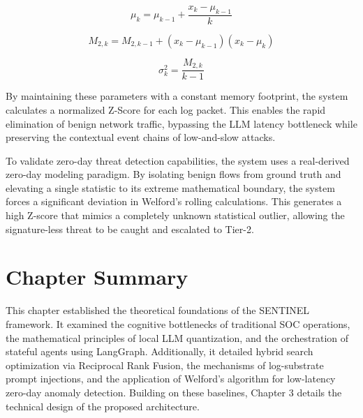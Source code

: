 \begin{equation}
    \label{eq:welford_mean}
    \mu_k = \mu_{k-1} + \frac{x_k - \mu_{k-1}}{k}
\end{equation}

\begin{equation}
    \label{eq:welford_m2}
    M_{2,k} = M_{2,k-1} + (x_k - \mu_{k-1})(x_k - \mu_k)
\end{equation}

\begin{equation}
    \label{eq:welford_var}
    \sigma_k^2 = \frac{M_{2,k}}{k-1}
\end{equation}

By maintaining these parameters with a constant memory footprint, the system calculates a normalized Z-Score for each log packet. This enables the rapid elimination of benign network traffic, bypassing the LLM latency bottleneck while preserving the contextual event chains of low-and-slow attacks.

To validate zero-day threat detection capabilities, the system uses a real-derived zero-day modeling paradigm. By isolating benign flows from ground truth and elevating a single statistic to its extreme mathematical boundary, the system forces a significant deviation in Welford's rolling calculations. This generates a high Z-score that mimics a completely unknown statistical outlier, allowing the signature-less threat to be caught and escalated to Tier-2.

\section{Chapter Summary}

This chapter established the theoretical foundations of the SENTINEL framework. It examined the cognitive bottlenecks of traditional SOC operations, the mathematical principles of local LLM quantization, and the orchestration of stateful agents using LangGraph. Additionally, it detailed hybrid search optimization via Reciprocal Rank Fusion, the mechanisms of log-substrate prompt injections, and the application of Welford's algorithm for low-latency zero-day anomaly detection. Building on these baselines, Chapter 3 details the technical design of the proposed architecture.
